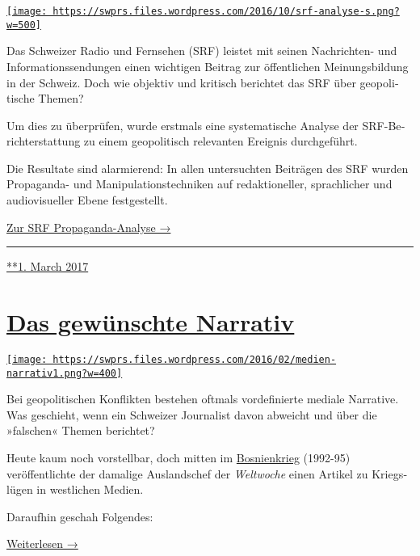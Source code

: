 \href{https://swprs.org/2017/03/01/srf-propaganda-analyse/}{\texttt{[image: https://swprs.files.wordpress.com/2016/10/srf-analyse-s.png?w=500]}}

Das Schweizer Radio und Fern­se­hen (SRF) leistet mit seinen
Nach­rich­ten- und In­for­ma­tions­sen­dungen einen wich­tigen Bei­trag
zur öffent­lichen Meinungs­bildung in der Schweiz. Doch wie objektiv und
kritisch be­rich­tet das SRF über geo­po­li­tische The­men?

Um dies zu über­prü­fen, wurde erst­mals eine sys­te­ma­tische Ana­lyse
der SRF-​Be­richt­er­stat­tung zu einem geo­po­li­tisch relevanten
Ereig­nis durch­ge­führt.

Die Resul­tate sind alar­mie­rend: In allen unter­such­ten Bei­trä­gen
des SRF wurden Pro­pa­ganda- und Mani­pu­la­tions­tech­niken auf
re­dak­tio­nel­ler, sprach­licher und audio­vi­su­el­ler Ebene
fest­ge­stellt.

\href{https://swprs.org/srf-propaganda-analyse/}{Zur SRF
Propaganda-Analyse →}

\begin{center}\rule{0.5\linewidth}{\linethickness}\end{center}

\href{https://swprs.org/2017/03/01/srf-propaganda-analyse/}{**1. March
2017}

\hypertarget{das-gewuxfcnschte-narrativ}{%
\section{\texorpdfstring{\href{https://swprs.org/2017/03/01/das-gewuenschte-narrativ/}{Das
gewünschte
Narrativ}}{Das gewünschte Narrativ}}\label{das-gewuxfcnschte-narrativ}}

\href{https://swprs.org/2017/03/01/das-gewuenschte-narrativ/}{\texttt{[image: https://swprs.files.wordpress.com/2016/02/medien-narrativ1.png?w=400]}}

Bei geopolitischen Konflikten bestehen oftmals vordefinierte mediale
Narrative. Was geschieht, wenn ein Schweizer Jour­na­list davon abweicht
und über die »falschen« Themen be­richtet?

Heute kaum noch vorstellbar, doch mitten im
\href{https://de.wikipedia.org/wiki/Bosnienkrieg}{Bosnien­krieg}
(1992-95) veröffentlichte der damalige Aus­lands­chef der
\emph{Welt­woche} einen Artikel zu Kriegs­lügen in west­lichen Medien.

Daraufhin geschah Folgendes:

\href{https://swprs.org/das-gewuenschte-narrativ\#weiterlesen}{Weiterlesen
→}

